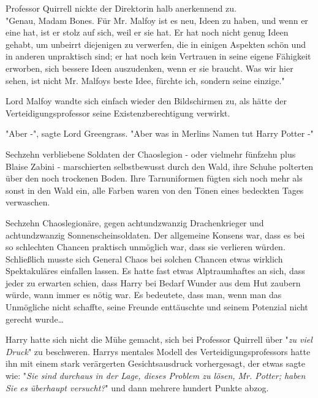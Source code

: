{Professor Quirrell nickte der Direktorin halb anerkennend zu.\\ "Genau, Madam Bones. Für Mr. Malfoy ist es neu, Ideen zu haben, und wenn er eine hat, ist er stolz auf sich, weil er sie hat. Er hat noch nicht genug Ideen gehabt, um unbeirrt diejenigen zu verwerfen, die in einigen Aspekten schön und in anderen unpraktisch sind; er hat noch kein Vertrauen in seine eigene Fähigkeit erworben, sich bessere Ideen auszudenken, wenn er sie braucht. Was wir hier sehen, ist nicht Mr. Malfoys beste Idee, fürchte ich, sondern seine einzige."

Lord Malfoy wandte sich einfach wieder den Bildschirmen zu, als hätte der Verteidigungsprofessor seine Existenzberechtigung verwirkt.

"Aber -", sagte Lord Greengrass. "Aber was in Merlins Namen tut Harry Potter -"

Sechzehn verbliebene Soldaten der Chaoslegion - oder vielmehr fünfzehn plus Blaise Zabini - marschierten selbstbewusst durch den Wald, ihre Schuhe polterten über den noch trockenen Boden. Ihre Tarnuniformen fügten sich noch mehr als sonst in den Wald ein, alle Farben waren von den Tönen eines bedeckten Tages verwaschen.

Sechzehn Chaoslegionäre, gegen achtundzwanzig Drachenkrieger und achtundzwanzig Sonnenscheinsoldaten. Der allgemeine Konsens war, dass es bei so schlechten Chancen praktisch unmöglich war, dass sie verlieren würden. Schließlich musste sich General Chaos bei solchen Chancen etwas wirklich Spektakuläres einfallen lassen. Es hatte fast etwas Alptraumhaftes an sich, dass jeder zu erwarten schien, dass Harry bei Bedarf Wunder aus dem Hut zaubern würde, wann immer es nötig war. Es bedeutete, dass man, wenn man das Unmögliche nicht schaffte, seine Freunde enttäuschte und seinem Potenzial nicht gerecht wurde…

Harry hatte sich nicht die Mühe gemacht, sich bei Professor Quirrell über "\emph{zu viel Druck}" zu beschweren. Harrys mentales Modell des Verteidigungsprofessors hatte ihn mit einem stark verärgerten Gesichtsausdruck vorhergesagt, der etwas sagte wie: "\emph{Sie sind durchaus in der Lage, dieses Problem zu lösen, Mr. Potter; haben Sie es überhaupt versucht?}" und dann mehrere hundert Punkte abzog.

}
